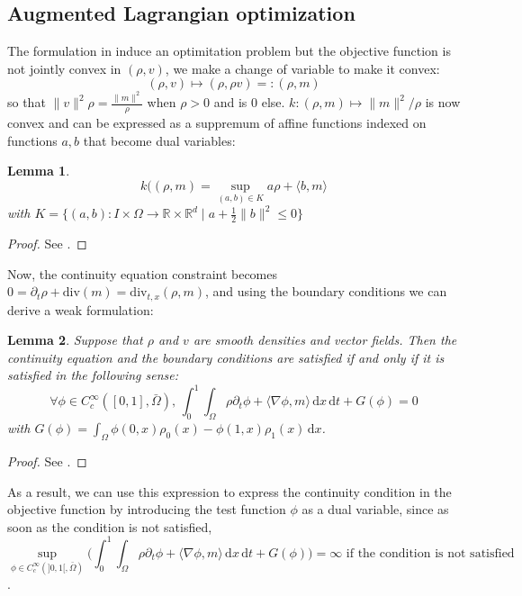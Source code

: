 \documentclass[a4paper]{article}
\newtheorem{lemme}{Lemma} %
\theoremstyle{definition}
\theoremstyle{remark}
\newcommand{\dd}{\,\mathrm{d}}
\newcommand{\R}{\mathbb{R}}
\newcommand{\ps}[2]{\langle#1,#2\rangle}
\renewcommand{\div}{\mathrm{div}}
\begin{document}
\subsection{Augmented Lagrangian optimization}
The formulation in  induce an optimitation problem but the objective function is not jointly convex in $(\rho,v)$, we make a change of variable to make it convex:
$$(\rho,v)\mapsto (\rho,\rho v)=:(\rho,m)$$
so that $\|v\|^2 \rho = \frac{\|m\|^2}{\rho}$ when $\rho>0$ and is 0 else. $k:(\rho,m)\mapsto \|m\|^2/\rho$ is now convex and can be expressed as a suppremum of affine functions indexed on functions $a,b$ that become dual variables:
\begin{lemme} \label{lem:k}
    $$k((\rho,m) = \sup_{(a,b)\in K} a\rho + \ps{b}{m}$$
    with $K = \{(a,b):I\times\Omega\to\R\times\R^d \;|\;  a + \frac12\|b\|^2 \leq 0 \}$
\end{lemme}
\begin{proof} See \cite[Lemma 5.17]{OT4ApplMath}.
\end{proof}

Now, the continuity equation constraint becomes $0 = \partial_t\rho + \div(m) = \div_{t,x}(\rho,m) $, and using the boundary conditions we can derive a weak formulation:
\begin{lemme} \label{lem:weak}
    Suppose that $\rho$ and $v$ are smooth densities and vector fields. Then the continuity equation and the boundary conditions are satisfied if and only if it is satisfied in the following sense:
    $$\forall \phi\in C_c^\infty([0,1],\bar{\Omega}),\, \int_0^1\int_\Omega \rho\partial_t\phi + \ps{\nabla\phi}{m} \dd x \dd t + G(\phi) = 0$$
    with $G(\phi) = \int_\Omega \phi(0,x)\rho_0(x) - \phi(1,x)\rho_1(x) \dd x $.
\end{lemme}
\begin{proof} See \cite[Proposition 4.3.]{OT4ApplMath}.
\end{proof}
As a result, we can use this expression to express the continuity condition in the objective function by introducing the test function $\phi$ as a dual variable, since as soon as the condition is not satisfied, $$\sup_{\phi\in C_c^\infty(]0,1[,\bar{\Omega})} \bigg(\int_0^1\int_\Omega \rho\partial_t\phi + \ps{\nabla\phi}{m} \dd x \dd t + G(\phi)\bigg) = \infty \text{ if the condition is not satisfied} $$.
\end{document}
